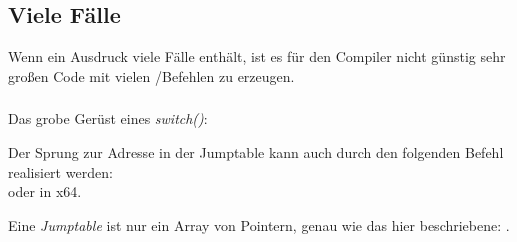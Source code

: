 \subsection{Viele Fälle}
Wenn ein  Ausdruck viele Fälle enthält, ist es für den Compiler nicht günstig sehr großen Code mit vielen
\JE/\JNE Befehlen zu erzeugen.







\subsubsection{\Conclusion{}}

Das grobe Gerüst eines \emph{switch()}:


Der Sprung zur Adresse in der Jumptable kann auch durch den folgenden Befehl realisiert werden:\\
oder  in x64.

Eine \emph{Jumptable} ist nur ein Array von Pointern, genau wie das hier beschriebene:
.
